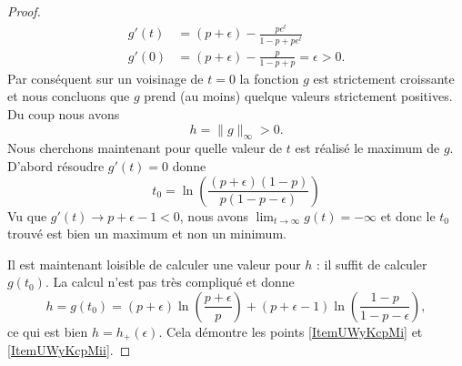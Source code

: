 \begin{proof}
\begin{subequations}
        \begin{align}
            g'(t)&=(p+\epsilon)- \frac{ pe^t }{ 1-p+pe^t }\\
            g'(0)&=(p+\epsilon)- \frac{ p }{ 1-p+p }=\epsilon>0.
        \end{align}
    \end{subequations}
    Par conséquent sur un voisinage de \( t=0\) la fonction \( g\) est strictement croissante et nous concluons que \( g\) prend (au moins) quelque valeurs strictement positives. Du coup nous avons
    \begin{equation}
        h=\| g \|_{\infty}>0.
    \end{equation}
    Nous cherchons maintenant pour quelle valeur de \( t\) est réalisé le maximum de \( g\). D'abord résoudre \( g'(t)=0\) donne
    \begin{equation}
        t_0=\ln\left( \frac{ (p+\epsilon)(1-p) }{ p(1-p-\epsilon) } \right)
    \end{equation}
    Vu que \( g'(t)\to p+\epsilon-1<0\), nous avons \( \lim_{t\to \infty} g(t)=-\infty\) et donc le \( t_0\) trouvé est bien un maximum et non un minimum.

    Il est maintenant loisible de calculer une valeur pour \( h\) : il suffit de calculer \( g(t_0)\). La calcul n'est pas très compliqué et donne
    \begin{equation}
        h=g(t_0)=(p+\epsilon)\ln\left( \frac{ p+\epsilon }{ p } \right)+(p+\epsilon-1)\ln\left( \frac{ 1-p }{ 1-p-\epsilon } \right),
    \end{equation}
    ce qui est bien \( h=h_+(\epsilon)\). Cela démontre les points \ref{ItemUWyKcpMi} et \ref{ItemUWyKcpMii}.


\end{proof}
